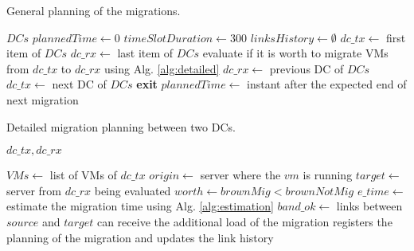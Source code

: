 \begin{algorithm}
\begin{algorithmic}
\caption{General planning of the migrations.}\label{alg:general}

\State $DCs$ 
\State $plannedTime \gets 0$
\State $timeSlotDuration \gets 300$
\State $linksHistory \gets \emptyset$
\State $dc\_tx \gets $ first item of $DCs$  %
        \State $dc\_rx \gets $ last item of $DCs$
            \State evaluate if it is worth to migrate VMs from $dc\_tx$ to $dc\_rx$ using Alg. \ref{alg:detailed}
            \State $dc\_rx \gets$ previous DC of $DCs$
            \EndWhile
        \EndIf
        \State $dc\_tx \gets$ next DC of $DCs$
    \EndWhile
       \State \textbf{exit}
    \EndIf
    \State $plannedTime \gets$  instant after the expected end of next migration 
\EndWhile
\end{algorithmic}
\end{algorithm}


\begin{algorithm}
\begin{algorithmic}
\caption{Detailed migration planning between two DCs.}\label{alg:detailed}
\Require $dc\_tx,dc\_rx$

\State $VMs \gets$ list of VMs of $dc\_tx$
    \State $origin \gets$ server where the $vm$ is running
    \State $target \gets$ server from $dc\_rx$ being evaluated
    \State $worth \gets brownMig < brownNotMig $
    \State $e\_time \gets $ estimate the migration time using Alg. \ref{alg:estimation} 
    \State $band\_ok \gets$ links between $source$ and $target$ can receive the additional load of the migration
    \State registers the planning of the migration and updates the link history   
    \EndIf
\EndFor

\end{algorithmic}
\end{algorithm}

